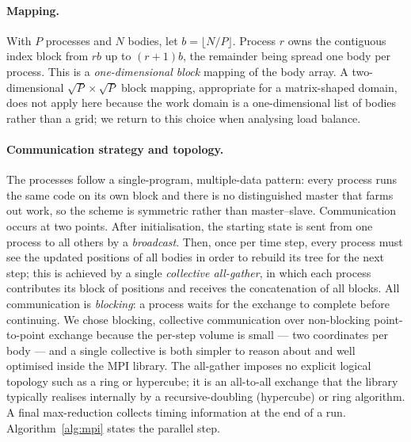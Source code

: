 \documentclass[11pt,a4paper]{article}
\begin{document}
\paragraph{Mapping.}
With $P$ processes and $N$ bodies, let $b=\lfloor N/P\rfloor$. Process $r$ owns the
contiguous index block from $rb$ up to $(r{+}1)b$, the remainder being spread
one body per process. This is a \emph{one-dimensional block} mapping of the body
array. A two-dimensional $\sqrt{P}\times\sqrt{P}$ block mapping, appropriate for a
matrix-shaped domain, does not apply here because the work domain is a
one-dimensional list of bodies rather than a grid; we return to this choice when
analysing load balance.

\paragraph{Communication strategy and topology.}
The processes follow a single-program, multiple-data pattern: every process runs
the same code on its own block and there is no distinguished master that farms out
work, so the scheme is symmetric rather than master--slave. Communication occurs at
two points. After initialisation, the starting state is sent from one process to
all others by a \emph{broadcast}. Then, once per time step, every process must see
the updated positions of all bodies in order to rebuild its tree for the next step;
this is achieved by a single \emph{collective all-gather}, in which each process
contributes its block of positions and receives the concatenation of all blocks.
All communication is \emph{blocking}: a process waits for the exchange to complete
before continuing. We chose blocking, collective communication over non-blocking
point-to-point exchange because the per-step volume is small --- two coordinates
per body --- and a single collective is both simpler to reason about and well
optimised inside the MPI library. The all-gather imposes no explicit logical
topology such as a ring or hypercube; it is an all-to-all exchange that the library
typically realises internally by a recursive-doubling (hypercube) or ring
algorithm. A final max-reduction collects timing information at the end of a run.
Algorithm~\ref{alg:mpi} states the parallel step.
\end{document}
